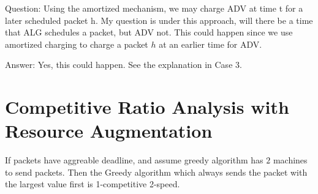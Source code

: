 \documentclass[10 pt,final]{article}
\newcommand{\answer}[1]{{\color{magenta} #1}}
\newcommand{\question}[1]{{\color{blue} #1}}
\begin{document}
\question{Question: Using the amortized mechanism, we may charge ADV at time t for a later scheduled packet h. My question is under this approach, will there be a time that ALG schedules a packet, but ADV not. This could happen since we use amortized charging to charge a packet $h$ at an earlier time for ADV. }

\answer{Answer: Yes, this could happen. See the explanation in Case 3.}


\section{Competitive Ratio Analysis with Resource Augmentation}
\begin{lemma} If packets have aggreable deadline, and assume greedy algorithm has $2$ machines to send packets. Then the Greedy algorithm which always sends the packet with the largest value first is 1-competitive 2-speed.
\end{lemma}
\end{document}
